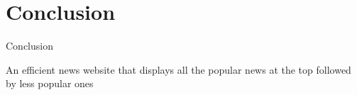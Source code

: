 \section{Conclusion}

\begin{frame}{Conclusion}
    \begin{center}\fontsize{15}{1}\selectfont
           An efficient news website that displays all the popular news at the top followed by less popular ones
        \end{center}
\end{frame}